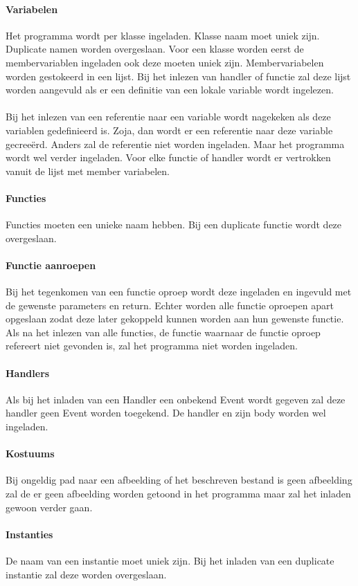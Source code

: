 \documentclass[]{article}
\begin{document}
\paragraph{Variabelen}
Het programma wordt per klasse ingeladen. Klasse naam moet uniek zijn. Duplicate namen worden overgeslaan. Voor een klasse worden eerst de membervariablen ingeladen ook deze moeten uniek zijn. Membervariabelen worden gestokeerd in een lijst. Bij het inlezen van handler of functie zal deze lijst worden aangevuld als er een definitie van een lokale variable wordt ingelezen.\\\\
Bij het inlezen van een referentie naar een variable wordt nagekeken als deze variablen gedefinieerd is. Zoja, dan wordt er een referentie naar deze variable gecree\"{e}rd. Anders zal de referentie niet worden ingeladen. Maar het programma wordt wel verder ingeladen. Voor elke functie of handler wordt er vertrokken vanuit de lijst met member variabelen.
\paragraph{Functies}
Functies moeten een unieke naam hebben. Bij een duplicate functie wordt deze overgeslaan.
\paragraph{Functie aanroepen}
Bij het tegenkomen van een functie oproep wordt deze ingeladen en ingevuld met de gewenste parameters en return. Echter worden alle functie oproepen apart opgeslaan zodat deze later gekoppeld kunnen worden aan hun gewenste functie. Als na het inlezen van alle functies, de functie waarnaar de functie oproep refereert niet gevonden is, zal het programma niet worden ingeladen.
\paragraph{Handlers}
Als bij het inladen van een Handler een onbekend Event wordt gegeven zal deze handler geen Event worden toegekend. De handler en zijn body worden wel ingeladen.
\paragraph{Kostuums}
Bij ongeldig pad naar een afbeelding of het beschreven bestand is geen afbeelding zal de er geen afbeelding worden getoond in het programma maar zal het inladen gewoon verder gaan. 
\paragraph{Instanties}
De naam van een instantie moet uniek zijn. Bij het inladen van een duplicate instantie zal deze worden overgeslaan.
\end{document}
